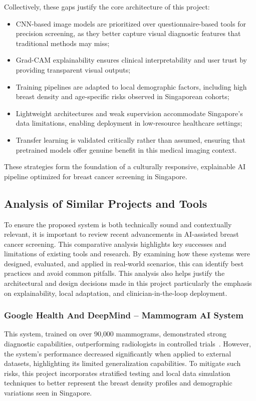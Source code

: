 \documentclass[12pt]{article}
\begin{document}
\vspace{0.5em}
Collectively, these gaps justify the core architecture of this project:
\begin{itemize}
    \item CNN-based image models are prioritized over questionnaire-based tools for precision screening, as they better capture visual diagnostic features that traditional methods may miss;
    
    \item Grad-CAM explainability ensures clinical interpretability and user trust by providing transparent visual outputs;
    
    \item Training pipelines are adapted to local demographic factors, including high breast density and age-specific risks observed in Singaporean cohorts;
    
    \item Lightweight architectures and weak supervision accommodate Singapore’s data limitations, enabling deployment in low-resource healthcare settings;
    
    \item Transfer learning is validated critically rather than assumed, ensuring that pretrained models offer genuine benefit in this medical imaging context.
\end{itemize}

These strategies form the foundation of a culturally responsive, explainable AI pipeline optimized for breast cancer screening in Singapore.


\subsection{Analysis of Similar Projects and Tools}

To ensure the proposed system is both technically sound and contextually relevant, it is important to review recent advancements in AI-assisted breast cancer screening. This comparative analysis highlights key successes and limitations of existing tools and research. By examining how these systems were designed, evaluated, and applied in real-world scenarios, this can identify best practices and avoid common pitfalls. This analysis also helps justify the architectural and design decisions made in this project particularly the emphasis on explainability, local adaptation, and clinician-in-the-loop deployment.


\subsubsection{Google Health And DeepMind – Mammogram AI System~\cite{11}}
    This system, trained on over 90{,}000 mammograms, demonstrated strong diagnostic capabilities, outperforming radiologists in controlled trials~\cite{11}. However, the system's performance decreased significantly when applied to external datasets, highlighting its limited generalization capabilities. To mitigate such risks, this project incorporates stratified testing and local data simulation techniques to better represent the breast density profiles and demographic variations seen in Singapore.
\end{document}
